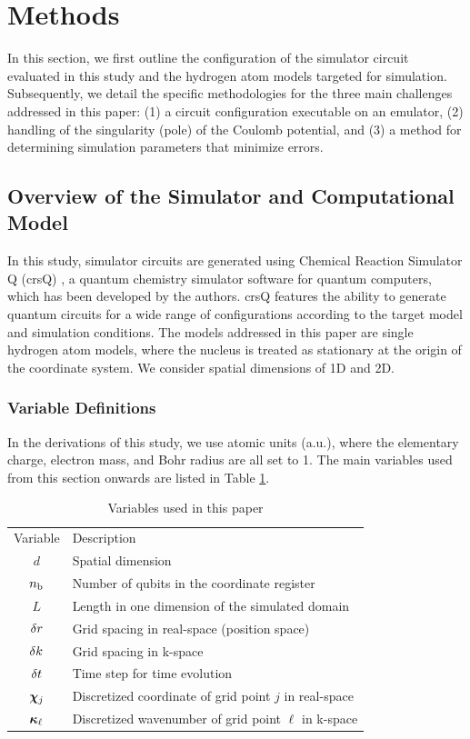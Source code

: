 \documentclass[aip-draft.tex]{subfiles}
\begin{document}
\section{Methods}
\label{sec:method}
In this section, we first outline the configuration of the simulator circuit
evaluated in this study and the hydrogen atom models targeted for simulation.
Subsequently, we detail the specific methodologies for the three main challenges
addressed in this paper: (1) a circuit configuration executable on an emulator,
(2) handling of the singularity (pole) of the Coulomb potential, and (3) a
method for determining simulation parameters that minimize errors.

\subsection{Overview of the Simulator and Computational Model}
\label{subsec:simulator-model}
In this study, simulator circuits are generated using Chemical Reaction
Simulator Q (crsQ) \cite{website:crsq}, a quantum chemistry simulator software
for quantum computers, which has been developed by the authors. crsQ features
the ability to generate quantum circuits for a wide range of configurations
according to the target model and simulation conditions. The models addressed in
this paper are single hydrogen atom models, where the nucleus is treated as
stationary at the origin of the coordinate system. We consider spatial
dimensions of 1D and 2D.

\subsubsection{Variable Definitions}
In the derivations of this study, we use atomic units (a.u.), where the
elementary charge, electron mass, and Bohr radius are all set to 1. The main
variables used from this section onwards are listed in Table
\ref{tab:variables}.

\begin{table}
    \centering
    \caption{Variables used in this paper}
    \begin{ruledtabular}\begin{tabular}{cl}
        Variable & Description \\
        \colrule
        $d$ & Spatial dimension \\
        $n_{\mathrm{b}}$ & Number of qubits in the coordinate register \\
        $L$ & Length in one dimension of the simulated domain \\
        $\delta r$ & Grid spacing in real-space (position space) \\
        $\delta k$ & Grid spacing in k-space \\
        $\delta t$ & Time step for time evolution \\
        $\bm{\chi}_{j}$ & Discretized coordinate of grid point $j$ in real-space\\
        $\bm{\kappa}_{\ell}$ & Discretized wavenumber of grid point $\ell$ in k-space
    \end{tabular}\end{ruledtabular}
    \label{tab:variables}
\end{table}
\end{document}
